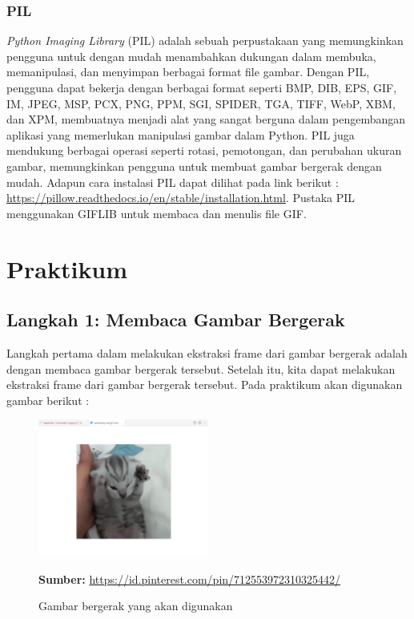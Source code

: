 \documentclass{assignment}
\newcommand\tab[1][0.5cm]{\hspace*{#1}}
\begin{document}
\subsubsection*{PIL}
\tab \textit{Python Imaging Library} (PIL) adalah sebuah perpustakaan yang memungkinkan pengguna untuk dengan mudah menambahkan dukungan dalam membuka, memanipulasi, dan menyimpan berbagai format file gambar. Dengan PIL, pengguna dapat bekerja dengan berbagai format seperti BMP, DIB, EPS, GIF, IM, JPEG, MSP, PCX, PNG, PPM, SGI, SPIDER, TGA, TIFF, WebP, XBM, dan XPM, membuatnya menjadi alat yang sangat berguna dalam pengembangan aplikasi yang memerlukan manipulasi gambar dalam Python. PIL juga mendukung berbagai operasi seperti rotasi, pemotongan, dan perubahan ukuran gambar, memungkinkan pengguna untuk membuat gambar bergerak dengan mudah. Adapun cara instalasi PIL dapat dilihat pada link berikut : \url{https://pillow.readthedocs.io/en/stable/installation.html}. Pustaka PIL menggunakan GIFLIB untuk membaca dan menulis file GIF.

\break


\section*{Praktikum}
\subsection*{Langkah 1: Membaca Gambar Bergerak}
\tab Langkah pertama dalam melakukan ekstraksi frame dari gambar bergerak adalah dengan membaca gambar bergerak tersebut. Setelah itu, kita dapat melakukan ekstraksi frame dari gambar bergerak tersebut. Pada praktikum akan digunakan gambar berikut :

\begin{figure}[H]
    \centering
    \includegraphics[width=0.5\textwidth]{./static/capture1.png}
    \caption{Gambar bergerak yang akan digunakan}
    \label{fig:gambar1}
    \textbf{Sumber:} \url{https://id.pinterest.com/pin/712553972310325442/}
\end{figure}
\end{document}
